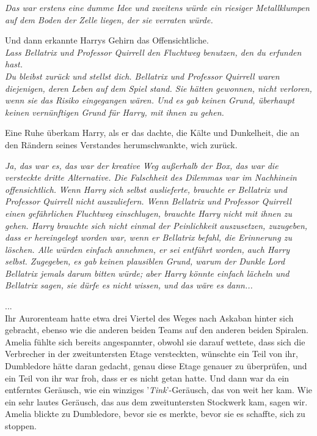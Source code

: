 {\emph{Das war erstens eine dumme Idee und zweitens würde ein riesiger Metallklumpen auf dem Boden der Zelle liegen, der sie verraten würde.}

Und dann erkannte Harrys Gehirn das Offensichtliche.\\ \emph{Lass Bellatrix und Professor Quirrell den Fluchtweg benutzen, den du erfunden hast.\\ Du bleibst zurück und stellst dich. Bellatrix und Professor Quirrell waren diejenigen, deren Leben auf dem Spiel stand. Sie hätten gewonnen, nicht verloren, wenn sie das Risiko eingegangen wären. Und es gab keinen Grund, überhaupt keinen vernünftigen Grund für Harry, mit ihnen zu gehen.}

Eine Ruhe überkam Harry, als er das dachte, die Kälte und Dunkelheit, die an den Rändern seines Verstandes herumschwankte, wich zurück.

\emph{Ja, das war es, das war der kreative Weg außerhalb der Box, das war die versteckte dritte Alternative. Die Falschheit des Dilemmas war im Nachhinein offensichtlich.} \emph{Wenn Harry sich selbst auslieferte, brauchte er Bellatrix und Professor Quirrell nicht auszuliefern. Wenn Bellatrix und Professor Quirrell einen gefährlichen Fluchtweg einschlugen, brauchte Harry nicht mit ihnen zu gehen. Harry brauchte sich nicht einmal der Peinlichkeit auszusetzen, zuzugeben, dass er hereingelegt worden war, wenn er Bellatrix befahl, die Erinnerung zu löschen. Alle würden einfach annehmen, er sei entführt worden, auch Harry selbst. Zugegeben, es gab keinen plausiblen Grund, warum der Dunkle Lord Bellatrix jemals darum bitten würde; aber Harry könnte einfach lächeln und Bellatrix sagen, sie dürfe es nicht wissen, und das wäre es dann...}

...\\ Ihr Aurorenteam hatte etwa drei Viertel des Weges nach Askaban hinter sich gebracht, ebenso wie die anderen beiden Teams auf den anderen beiden Spiralen. Amelia fühlte sich bereits angespannter, obwohl sie darauf wettete, dass sich die Verbrecher in der zweituntersten Etage versteckten, wünschte ein Teil von ihr, Dumbledore hätte daran gedacht, genau diese Etage genauer zu überprüfen, und ein Teil von ihr war froh, dass er es nicht getan hatte. Und dann war da ein entferntes Geräusch, wie ein winziges '\emph{Tink}'-Geräusch, das von weit her kam. Wie ein sehr lautes Geräusch, das aus dem zweituntersten Stockwerk kam, sagen wir. Amelia blickte zu Dumbledore, bevor sie es merkte, bevor sie es schaffte, sich zu stoppen.

}
